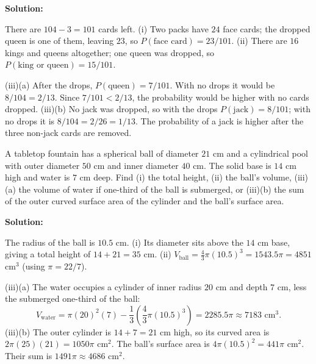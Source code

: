 \documentclass[journal]{IEEEtran}
\begin{document}
\begin{list}{}{\setlength{\leftmargin}{1.15cm}\setlength{\labelwidth}{1.0cm}\setlength{\labelsep}{0.15cm}\setlength{\itemindent}{0pt}\setlength{\listparindent}{0pt}\setlength{\parsep}{0pt}\setlength{\topsep}{0pt}}
\vspace{0.6em}\par\noindent\textbf{Solution:}

There are $104-3=101$ cards left. (i) Two packs have $24$ face cards; the dropped queen is one of them, leaving $23$, so $P(\text{face card})=23/101$. (ii) There are $16$ kings and queens altogether; one queen was dropped, so $P(\text{king or queen})=15/101$.

(iii)(a) After the drops, $P(\text{queen})=7/101$. With no drops it would be $8/104=2/13$. Since $7/101<2/13$, the probability would be higher with no cards dropped. (iii)(b) No jack was dropped, so with the drops $P(\text{jack})=8/101$; with no drops it is $8/104=2/26=1/13$. The probability of a jack is higher after the three non-jack cards are removed.

\item[3.1.38] A tabletop fountain has a spherical ball of diameter $21$ cm and a cylindrical pool with outer diameter $50$ cm and inner diameter $40$ cm. The solid base is $14$ cm high and water is $7$ cm deep. Find (i) the total height, (ii) the ball's volume, (iii)(a) the volume of water if one-third of the ball is submerged, or (iii)(b) the sum of the outer curved surface area of the cylinder and the ball's surface area.

\vspace{0.6em}\par\noindent\textbf{Solution:}

The radius of the ball is $10.5$ cm. (i) Its diameter sits above the $14$ cm base, giving a total height of $14+21=35$ cm. (ii) $V_{\text{ball}}=\frac43\pi(10.5)^3=1543.5\pi=4851$ cm$^3$ (using $\pi=22/7$).

(iii)(a) The water occupies a cylinder of inner radius $20$ cm and depth $7$ cm, less the submerged one-third of the ball:
\[
V_{\text{water}}=\pi(20)^2(7)-\frac13\left(\frac43\pi(10.5)^3\right)=2285.5\pi\approx7183\text{ cm}^3.
\]
(iii)(b) The outer cylinder is $14+7=21$ cm high, so its curved area is $2\pi(25)(21)=1050\pi$ cm$^2$. The ball's surface area is $4\pi(10.5)^2=441\pi$ cm$^2$. Their sum is $1491\pi\approx4686$ cm$^2$.
\end{list}
\end{document}

